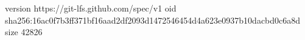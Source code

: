 version https://git-lfs.github.com/spec/v1
oid sha256:16ac0f7b3ff371bf16aad2df2093d1472546454d4a623e0937b10dacbd0c6a8d
size 42826
